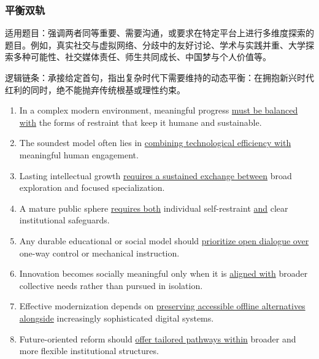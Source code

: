 

\subsubsection{平衡双轨}



适用题目：强调两者同等重要、需要沟通，或要求在特定平台上进行多维度探索的题目。例如，真实社交与虚拟网络、分歧中的友好讨论、学术与实践并重、大学探索多种可能性、社交媒体责任、师生共同成长、中国梦与个人价值等。



逻辑链条：承接给定首句，指出复杂时代下需要维持的动态平衡：在拥抱新兴时代红利的同时，绝不能抛弃传统根基或理性约束。



\begin{enumerate}

    \item In a complex modern environment, meaningful progress \underline{must be balanced with} the forms of restraint that keep it humane and sustainable.

    \item The soundest model often lies in \underline{combining technological efficiency with} meaningful human engagement.

    \item Lasting intellectual growth \underline{requires a sustained exchange between} broad exploration and focused specialization.

    \item A mature public sphere \underline{requires both} individual self-restraint \underline{and} clear institutional safeguards.

    \item Any durable educational or social model should \underline{prioritize open dialogue over} one-way control or mechanical instruction.

    \item Innovation becomes socially meaningful only when it is \underline{aligned with} broader collective needs rather than pursued in isolation.

    \item Effective modernization depends on \underline{preserving accessible offline alternatives alongside} increasingly sophisticated digital systems.

    \item Future-oriented reform should \underline{offer tailored pathways within} broader and more flexible institutional structures.


\end{enumerate}
